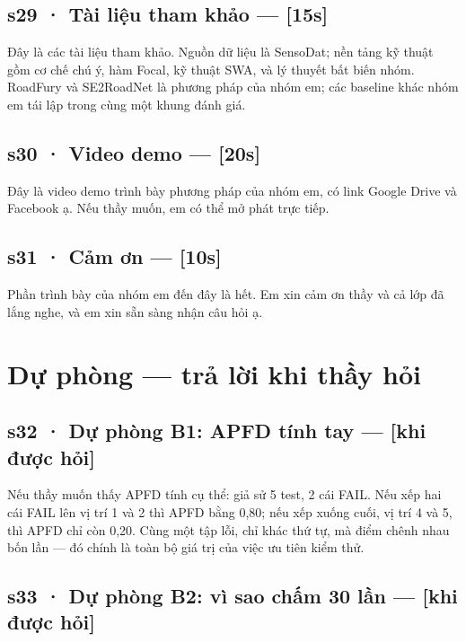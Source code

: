 \documentclass[
  11pt,
]{article}
\begin{document}
\subsection{s29 · Tài liệu tham khảo ---
{[}15s{]}}\label{s29-tuxe0i-liux1ec7u-tham-khux1ea3o-15s}

Đây là các tài liệu tham khảo. Nguồn dữ liệu là SensoDat; nền tảng kỹ
thuật gồm cơ chế chú ý, hàm Focal, kỹ thuật SWA, và lý thuyết bất biến
nhóm. RoadFury và SE2RoadNet là phương pháp của nhóm em; các baseline
khác nhóm em tái lập trong cùng một khung đánh giá.

\subsection{s30 · Video demo --- {[}20s{]}}\label{s30-video-demo-20s}

Đây là video demo trình bày phương pháp của nhóm em, có link Google
Drive và Facebook ạ. Nếu thầy muốn, em có thể mở phát trực tiếp.

\subsection{s31 · Cảm ơn --- {[}10s{]}}\label{s31-cux1ea3m-ux1a1n-10s}

Phần trình bày của nhóm em đến đây là hết. Em xin cảm ơn thầy và cả lớp
đã lắng nghe, và em xin sẵn sàng nhận câu hỏi ạ.

\section{Dự phòng --- trả lời khi thầy
hỏi}\label{dux1ef1-phuxf2ng-trux1ea3-lux1eddi-khi-thux1ea7y-hux1ecfi}

\subsection{s32 · Dự phòng B1: APFD tính tay --- {[}khi được
hỏi{]}}\label{s32-dux1ef1-phuxf2ng-b1-apfd-tuxednh-tay-khi-ux111ux1b0ux1ee3c-hux1ecfi}

Nếu thầy muốn thấy APFD tính cụ thể: giả sử 5 test, 2 cái FAIL. Nếu xếp
hai cái FAIL lên vị trí 1 và 2 thì APFD bằng 0,80; nếu xếp xuống cuối,
vị trí 4 và 5, thì APFD chỉ còn 0,20. Cùng một tập lỗi, chỉ khác thứ tự,
mà điểm chênh nhau bốn lần --- đó chính là toàn bộ giá trị của việc ưu
tiên kiểm thử.

\subsection{s33 · Dự phòng B2: vì sao chấm 30 lần --- {[}khi được
hỏi{]}}\label{s33-dux1ef1-phuxf2ng-b2-vuxec-sao-chux1ea5m-30-lux1ea7n-khi-ux111ux1b0ux1ee3c-hux1ecfi}
\end{document}
